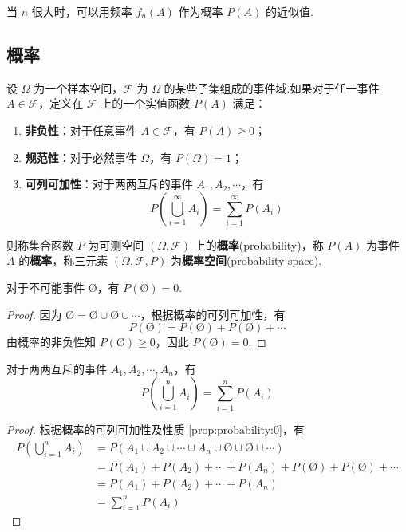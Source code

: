 当 $n$ 很大时，可以用频率 $f_n(A)$ 作为概率 $P(A)$ 的近似值.

\subsection{概率}

\begin{definition}
    \indent 设 $\varOmega$ 为一个样本空间，$\mathcal{F}$ 为 $\varOmega$ 的某些子集组成的事件域.如果对于任一事件 $A \in \mathcal{F}$，定义在 $\mathcal{F}$ 上的一个实值函数 $P(A)$ 满足：
    \begin{enumerate}
        \item \textbf{非负性}：对于任意事件 $A \in \mathcal{F}$，有 $P(A) \geqslant 0$；
        \item \textbf{规范性}：对于必然事件 $\varOmega$，有 $P(\varOmega)=1$；
        \item \textbf{可列可加性}：对于两两互斥的事件 $A_1,A_2,\cdots$，有
        $$
        P \left(\bigcup_{i=1}^\infty A_i \right) = \sum_{i=1}^\infty P(A_i)
        $$
    \end{enumerate}
    则称集合函数 $P$ 为可测空间 $(\varOmega, \mathcal{F})$ 上的\textbf{概率}(probability)，称 $P(A)$ 为事件 $A$ 的\textbf{概率}，称三元素 $(\varOmega, \mathcal{F}, P)$ 为\textbf{概率空间}(probability space).
\end{definition}

\begin{property}
    \indent 对于不可能事件 $\text{\O}$，有 $P(\text{\O})=0$.
\end{property}

\begin{proof}
    因为 $\text{\O} = \text{\O} \cup \text{\O} \cup \cdots$，根据概率的可列可加性，有
    $$
    P(\text{\O}) = P(\text{\O}) + P(\text{\O}) + \cdots
    $$
    由概率的非负性知 $P(\text{\O}) \geqslant 0$，因此 $P(\text{\O})=0$.
\end{proof}

\begin{property}
    \indent 对于两两互斥的事件 $A_1,A_2,\cdots,A_n$，有
    \begin{equation}
        P \left(\bigcup_{i=1}^n A_i \right) = \sum_{i=1}^n P(A_i)
    \end{equation}
\end{property}

\begin{proof}
    根据概率的可列可加性及性质 \ref{prop:probability:0}，有
    $$
    \begin{aligned}
        P \left(\bigcup_{i=1}^n A_i \right) &= P(A_1 \cup A_2 \cup \cdots \cup A_n \cup \text{\O} \cup \text{\O} \cup \cdots) \\
        &= P(A_1) + P(A_2) + \cdots + P(A_n) + P(\text{\O}) + P(\text{\O}) + \cdots \\
        &= P(A_1) + P(A_2) + \cdots + P(A_n) \\
        &= \sum_{i=1}^n P(A_i)
    \end{aligned}
    $$
\end{proof}

